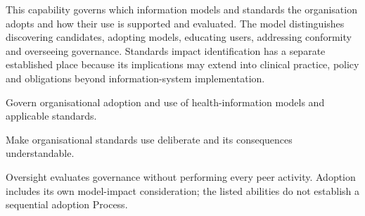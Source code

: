 This capability governs which information models and standards the organisation adopts and how their use is supported and evaluated. The model distinguishes discovering candidates, adopting models, educating users, addressing conformity and overseeing governance. Standards impact identification has a separate established place because its implications may extend into clinical practice, policy and obligations beyond information-system implementation.



Govern organisational adoption and use of health-information models and applicable standards.



Make organisational standards use deliberate and its consequences understandable.



Oversight evaluates governance without performing every peer activity. Adoption includes its own model-impact consideration; the listed abilities do not establish a sequential adoption Process.


